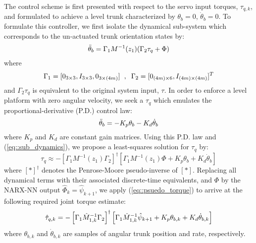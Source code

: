 The control scheme is first presented with respect to the servo input torques, $\tau_{q,k}$, and formulated to achieve a level trunk characterized by $\theta_{b}=0$, $\dot{\theta}_{b}= 0$. To formulate this controller, we first isolate the dynamical sub-system which corresponds to the un-actuated trunk orientation states by:
	\begin{equation}
		\vspace{-3.5mm}
		\begin{split}
		\ddot{\theta}_{b} 	= \Gamma_{1} M^{-1}(z_{1})( \Gamma_{2}\tau_{q}	 + \Phi) \\
		\end{split}	
		\label{eq::sub_dynamics}
	\end{equation}
where 
	\begin{equation*}
		\Gamma_{1} = [0_{3\times3},I_{3\times3},0_{3\times(4m)}] 
		\hspace{2mm},\hspace{2mm} 
		\Gamma_{2} = [0_{(4m)\times6},I_{(4m)\times(4m)}]^{T}
	\end{equation*}
and $\Gamma_{2}\tau_{q}$ is equivalent to the original system input, $\tau$. In order to enforce a level platform with zero angular velocity, we seek a $\tau_{q}$ which emulates the proportional-derivative (P.D.) control law:
	\begin{equation}
		\vspace{-1mm}
	 	\ddot{\theta}_{b} = - K_{p}{\theta}_{b} - K_{d}\dot{\theta}_{b}
	\end{equation}
where $K_{p}$ and $K_{d}$ are constant gain matrices. Using this P.D. law and (\ref{eq::sub_dynamics}), we propose a least-squares solution for $\tau_{q}$ by:
	\begin{equation}
		\tau_{q} \approx  -
		\left[\Gamma_{1} M^{-1}(z_{1}) \Gamma_{2}\right]^{\dagger}
		\left[\Gamma_{1} M^{-1}(z_{1}) \Phi + K_{p}{\theta}_{b} + K_{d}\dot{\theta}_{b} \right]
		\label{eq::psuedo_torque}
	\end{equation}
where $\left[*\right]^{\dagger}$ denotes the Penrose-Moore pseudo-inverse of $[*]$.
Replacing all dynamical terms with their associated discrete-time equivalents, and $\Phi$ by the NARX-NN output $\hat{\Phi}_{k}=\hat{\psi}_{k+1}$, we apply (\ref{eq::psuedo_torque}) to arrive at the following required joint torque estimate:
	\vspace{-1mm}
	\begin{equation}
		\vspace{-1mm}
		\hat{\tau}_{q,k} = -
		\left[\Gamma_{1} \hat{M}^{-1}_{1,k} \Gamma_{2}\right]^{\dagger} 
		\left[\Gamma_{1}\hat{M}^{-1}_{1,k}\hat{\psi}_{k+1} + K_{p}{\theta}_{b,k} + K_{d}\dot{\theta}_{b,k} \right]
		\label{eq::psuedo_torque_k}
	\end{equation}
where ${\theta}_{b,k}$ and $\dot{\theta}_{b,k}$ are samples of angular trunk position and rate, respectively.

